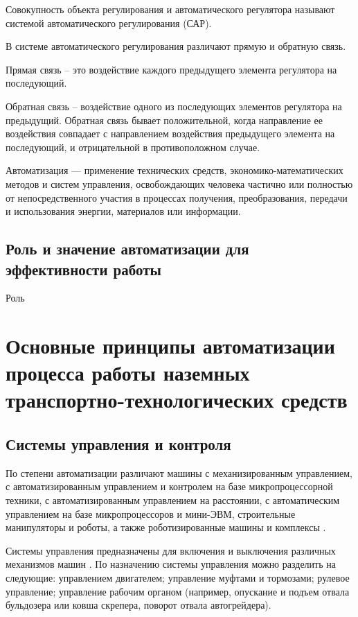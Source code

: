 Совокупность объекта регулирования и автоматического регулятора называют системой автоматического регулирования (САР).

В системе автоматического регулирования различают прямую и обратную связь.

Прямая связь -- это воздействие каждого предыдущего элемента регулятора на последующий.

Обратная связь -- воздействие одного из последующих элементов регулятора на предыдущий. Обратная связь бывает положительной, когда направление ее воздействия совпадает с направлением воздействия предыдущего элемента на последующий, и отрицательной в противоположном случае.

Автоматизация — применение технических средств, экономико-математических методов и систем управления, освобождающих человека частично или полностью от непосредственного участия в процессах получения, преобразования, передачи и использования энергии, материалов или информации.

\subsection{Роль и значение автоматизации для эффективности работы}\label{subsec:ch1/sec1/sub2}

Роль

\section{Основные принципы автоматизации процесса работы наземных транспортно-технологических средств}\label{sec:ch1/sec2}

\subsection{Системы управления и контроля}\label{subsec:ch1/sec2/sub1}

По степени автоматизации различают машины с механизированным управлением, с автоматизированным управлением и контролем на базе микропроцессорной техники, с автоматизированным управлением на расстоянии, с автоматическим управлением на базе микропроцессоров и мини-ЭВМ, строительные манипуляторы и роботы, а также роботизированные машины и комплексы \cite[с.~39]{Evtukov}.

Системы управления предназначены для включения и выключения различных механизмов машин \cite[с.~109]{Evtukov}.
По назначению системы управления можно разделить на следующие: управлением двигателем; управление муфтами и тормозами; рулевое управление; управление рабочим органом (например, опускание и подъем отвала бульдозера или ковша скрепера, поворот отвала автогрейдера).

